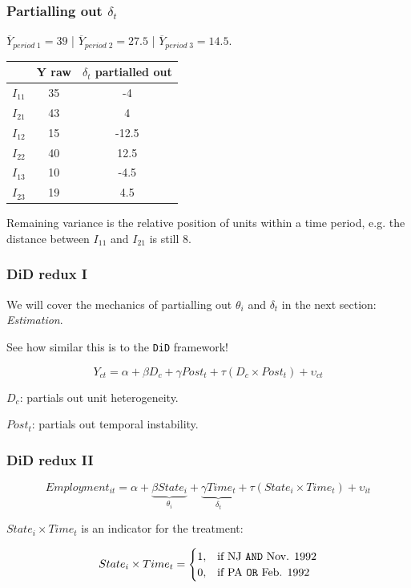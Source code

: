 \documentclass[11pt,english,dvipsnames,aspectratio=169,handout]{beamer}\usepackage[]{graphicx}\usepackage[]{xcolor}
\begin{document}
\begin{frame}
\frametitle{Partialling out $\delta_t$}
$\overline{Y}_{period\; 1}=39$ | $\overline{Y}_{period\; 2}=27.5$ | $\overline{Y}_{period\; 3}=14.5$. \bigskip

\begin{table}
\centering
\begin{tabular}{l c c}
\toprule
    & Y raw & $\delta_t$ partialled out \\
\midrule
$I_{11}$ & 35 & -4 \\
$I_{21}$ & 43 & 4 \\
\midrule
$I_{12}$ & 15 & -12.5 \\
$I_{22}$ & 40 &  12.5 \\
\midrule
$I_{13}$ & 10 & -4.5 \\
$I_{23}$ & 19 &  4.5 \\
\bottomrule
\end{tabular}
\end{table}
\bigskip
\pause

Remaining variance is the relative position of units within a time period, e.g. the distance between $I_{11}$ and $I_{21}$ is still 8.
\end{frame}


\begin{frame}
\frametitle{DiD redux I}
We will cover the mechanics of partialling out $\theta_i$ and $\delta_t$ in the next section: \textit{Estimation}.\bigskip

See how similar this is to the \texttt{DiD} framework!\bigskip
\pause

\begin{equation}
  Y_{ct} = \alpha + \beta D_c + \gamma Post_t + \tau (D_c \times Post_t) + \upsilon_{ct}
\end{equation}
\pause

$D_c$: partials out unit heterogeneity.

$Post_t$: partials out temporal instability.


\end{frame}


\begin{frame}
\frametitle{DiD redux II}

\begin{equation}
  Employment_{it} = \alpha + \underbrace{\beta State_i}_{\theta_i} + \underbrace{\gamma Time_t}_{\delta_t} + \tau (State_i \times Time_t) + \upsilon_{it}
\end{equation}
\pause

$State_i \times Time_t$ is an indicator for the treatment:

\begin{equation}
  State_i \times Time_t=\begin{cases}
    1, & \text{if NJ \texttt{AND} Nov. 1992}\\
    0, & \text{if PA \texttt{OR} Feb. 1992}
  \end{cases}
\end{equation}
\pause

\end{frame}
\end{document}
